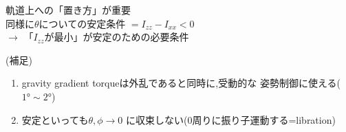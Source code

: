 \documentclass[class=article, crop=false, dvipdfmx, fleqn]{standalone}
\begin{document}
\begin{minipage}{0.4\linewidth}

\end{minipage}
\begin{minipage}{0.4\linewidth}
軌道上への「置き方」が重要\\
同様に$\theta$についての安定条件
$=I_{zz}-I_{xx}<0$\\
\qquad\qquad$\rightarrow$
「$I_{zz}$が最小」が安定のための必要条件
\end{minipage}


\noindent
(補足)
\begin{enumerate}
\item gravity gradient torqueは外乱であると同時に,受動的な
姿勢制御に使える($\ang{1}\sim\ang{2}$)
\item 安定といっても$\theta,\phi \rightarrow 0$
に収束しない(0周りに振り子運動する=libration)
\end{enumerate}
\end{document}
